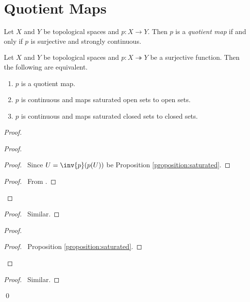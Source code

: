 \section{Quotient Maps}

\begin{definition}
    Let $X$ and $Y$ be topological spaces and $p : X \rightarrow Y$. Then $p$ is a \emph{quotient map} if and only if $p$ is surjective and strongly continuous.
\end{definition}

\begin{proposition}
    \label{proposition:quotient_map}
    Let $X$ and $Y$ be topological spaces and $p : X \twoheadrightarrow Y$ be a surjective function. Then the following are equivalent.
    \begin{enumerate}
        \item $p$ is a quotient map.
        \item $p$ is continuous and maps saturated open sets to open sets.
        \item $p$ is continuous and maps saturated closed sets to closed sets.
    \end{enumerate}
\end{proposition}

\begin{proof}
    \pf
    \begin{proof}
        \begin{proof}
            \pf\ Since $U = \inv{p}(p(U))$ be Proposition \ref{proposition:saturated}.
        \end{proof}
        \begin{proof}
            \pf\ From .
        \end{proof}
    \end{proof}
    \begin{proof}
        \pf\ Similar.
    \end{proof}
    \begin{proof}
        \begin{proof}
            \pf\ Proposition \ref{proposition:saturated}.
        \end{proof}
    \end{proof}
    \begin{proof}
        \pf\ Similar.
    \end{proof}
    \qed
\end{proof}

